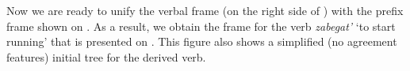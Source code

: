 


Now we are ready to unify the verbal frame (on the right side of ) with the prefix frame shown on . As a result, we obtain the frame for the verb \textit{zabegat'} `to start running' that is presented on . This figure also shows a simplified (no agreement features) initial tree for the derived verb.

